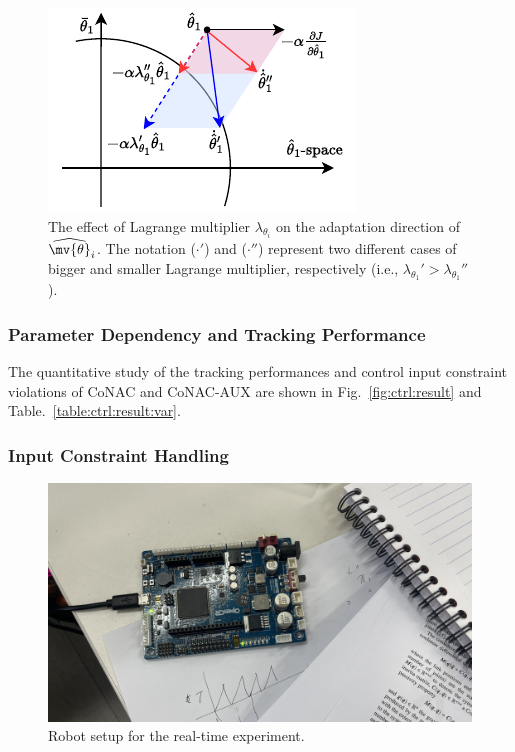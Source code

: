 \documentclass[final,5p,times,twocolumn,authoryear]{elsarticle}
\newcommand*{\figSizeOneCol}{0.98}
\begin{document}
\begin{figure}[!t]
	\centering
	\includegraphics[width=0.6\linewidth]{
		src/figures/lambda_effect.drawio.pdf
		}
	\caption{
		The effect of Lagrange multiplier $\lambda_{\theta_i}$ on the adaptation direction of $\widehat{ \mv{\theta}}_i$.
		The notation ($\cdot'$) and ($\cdot''$) represent two different cases of bigger and smaller Lagrange multiplier, respectively (i.e., $\lambda_{\theta_1}' > \lambda_{\theta_1}''$).
	}
	\label{fig:lambda_effect}
\end{figure}

\subsubsection{Parameter Dependency and Tracking Performance}

The quantitative study of the tracking performances and control input constraint violations of CoNAC and CoNAC-AUX are shown in Fig.~\ref{fig:ctrl:result} and Table.~\ref{table:ctrl:result:var}. 



\subsubsection{Input Constraint Handling}

\begin{figure}[t]
    \centering
        \includegraphics[width=\figSizeOneCol\linewidth]
        {
            fig/exp_set.jpg
        }%
    \caption{
        Robot setup for the real-time experiment.
    }
    \label{fig:ctrl:exp:set}
  \end{figure}
\end{document}
